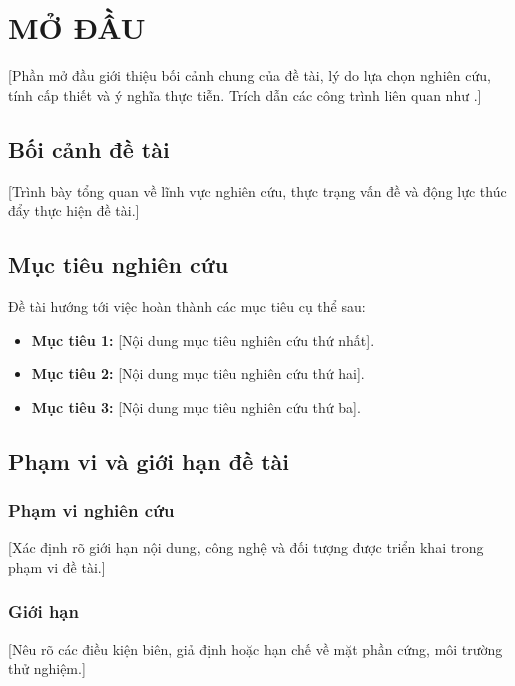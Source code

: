 \chapter{MỞ ĐẦU}
\label{chap:introduction}

[Phần mở đầu giới thiệu bối cảnh chung của đề tài, lý do lựa chọn nghiên cứu, tính cấp thiết và ý nghĩa thực tiễn. Trích dẫn các công trình liên quan như \cite{sample_book, sample_article}.]

\section{Bối cảnh đề tài}
\label{sec:background}

[Trình bày tổng quan về lĩnh vực nghiên cứu, thực trạng vấn đề và động lực thúc đẩy thực hiện đề tài.]

\section{Mục tiêu nghiên cứu}
\label{sec:objectives}

Đề tài hướng tới việc hoàn thành các mục tiêu cụ thể sau:
\begin{itemize}
    \item \textbf{Mục tiêu 1:} [Nội dung mục tiêu nghiên cứu thứ nhất].
    \item \textbf{Mục tiêu 2:} [Nội dung mục tiêu nghiên cứu thứ hai].
    \item \textbf{Mục tiêu 3:} [Nội dung mục tiêu nghiên cứu thứ ba].
\end{itemize}

\section{Phạm vi và giới hạn đề tài}
\label{sec:scope}

\subsection{Phạm vi nghiên cứu}
[Xác định rõ giới hạn nội dung, công nghệ và đối tượng được triển khai trong phạm vi đề tài.]

\subsection{Giới hạn}
[Nêu rõ các điều kiện biên, giả định hoặc hạn chế về mặt phần cứng, môi trường thử nghiệm.]

